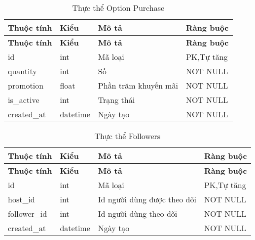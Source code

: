 \begin{center}
\begin{longtabu} to 
\caption{Thực thể Option Purchase} \\
   \hline \textbf{Thuộc tính}  & \textbf{Kiểu} & \textbf{Mô tả} & \textbf{Ràng buộc} \\ \hline
   \endfirsthead
   \hline \textbf{Thuộc tính}  & \textbf{Kiểu} & \textbf{Mô tả} & \textbf{Ràng buộc} \\ \hline
   \endhead
      id & int  & Mã loại & PK,Tự tăng
      \\ \hline
      quantity & int & Số  & NOT NULL
      \\ \hline
      promotion & float & Phần trăm khuyến mãi & NOT NULL 
       \\ \hline
      is\_active & int & Trạng thái & NOT NULL
      \\ \hline
      created\_at & datetime & Ngày tạo & NOT NULL
      \\ \hline
\end{longtabu}
\end{center}

\begin{center}
\begin{longtabu} to 
\caption{Thực thể Followers} \\
   \hline \textbf{Thuộc tính}  & \textbf{Kiểu} & \textbf{Mô tả} & \textbf{Ràng buộc} \\ \hline
   \endfirsthead
   \hline \textbf{Thuộc tính}  & \textbf{Kiểu} & \textbf{Mô tả} & \textbf{Ràng buộc} \\ \hline
   \endhead
      id & int  & Mã loại & PK,Tự tăng
      \\ \hline
      host\_id & int & Id người dùng được theo dõi & NOT NULL
      \\ \hline
      follower\_id & int & Id người dùng theo dõi & NOT NULL 
       \\ \hline
      created\_at & datetime & Ngày tạo & NOT NULL
      \\ \hline
\end{longtabu}
\end{center}

